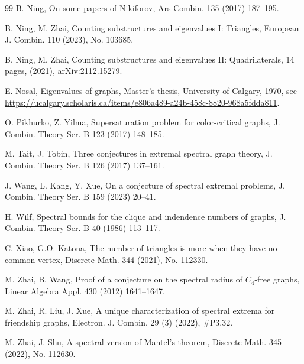 \documentclass[11pt]{article}
\begin{document}
\begin{thebibliography}{99}
 B. Ning, On some papers of Nikiforov, 
 Ars Combin. 135 (2017) 187--195. 
 
B. Ning, M. Zhai, Counting substructures and eigenvalues I: Triangles, 
European J. Combin.  110 (2023), No. 103685. 

B. Ning, M. Zhai, Counting substructures and eigenvalues II: Quadrilaterals,
14 pages, (2021), arXiv:2112.15279.

E. Nosal, Eigenvalues of graphs, Master's thesis, University of Calgary, 1970,  
see \url{https://ucalgary.scholaris.ca/items/e806a489-a24b-458c-8820-968a5fdda811}.  


O. Pikhurko, Z. Yilma, 
Supersaturation problem for color-critical graphs, 
J. Combin. Theory Ser. B 123 (2017) 148--185.


M. Tait, J. Tobin,
Three conjectures in extremal spectral graph theory,
J. Combin. Theory Ser. B 126 (2017) 137--161.


J. Wang, L. Kang, Y. Xue, On a conjecture of spectral extremal problems, J. Combin. Theory Ser. B 159 (2023) 20--41.  

H. Wilf, 
Spectral bounds for the clique and indendence numbers of graphs, 
J. Combin. Theory Ser. B 40 (1986) 113--117.  


C. Xiao, G.O. Katona, 
 The number of triangles is more when they have no
common vertex, Discrete Math. 344 (2021), No. 112330. 

M. Zhai, B. Wang, 
Proof of a conjecture on the spectral radius of $C_4$-free
graphs, Linear Algebra Appl. 430 (2012) 1641--1647. 


M. Zhai, R. Liu, J. Xue,
A unique characterization of spectral extrema for friendship graphs,
Electron. J. Combin. 29 (3) (2022), \#P3.32.

M. Zhai, J. Shu, 
A spectral version of Mantel's theorem, 
Discrete Math. 345 (2022), No. 112630. 


\end{thebibliography}
\end{document}

